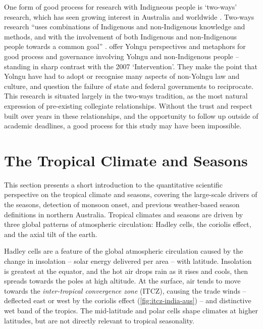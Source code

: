 One form of good process for research with Indigneous people is `two-ways'
research, which has seen growing interest in Australia and worldwide
\citep{turner2009,prober2011}.  Two-ways research ``uses combinations of
Indigenous and non-Indigenous knowledge and methods, and with the involvement
of both Indigenous and non-Indigenous people towards a common goal''
\citep{ens2014}.
%
\citet{marika2009} offer Yolngu perspectives and metaphors for good process
and governance involving Yolngu and non-Indigenous people -- standing in sharp
contrast with the 2007 `Intervention'.  They make the point that Yolngu have
had to adopt or recognise many aspects of non-Yolngu law and culture, and
question the failure of state and federal governments to reciprocate.
%
This research is situated largely in the two-ways tradition, as the most
natural expression of pre-existing collegiate relationships.  Without the
trust and respect built over years in these relationships, and the opportunity
to follow up outside of academic deadlines, a good process for this study
may have been impossible.



\section{The Tropical Climate and Seasons}
\label{sec:lit-tropical-climate}


This section presents a short introduction to the quantitative scientific
perspective on the tropical climate and seasons, covering the large-scale
drivers of the seasons, detection of monsoon onset, and previous
weather-based season definitions in northern Australia.
%
Tropical climates and seasons are driven by three global patterns of
atmospheric circulation:  Hadley cells, the coriolis effect, and the axial
tilt of the earth.

Hadley cells are a feature of the global atmospheric circulation
caused by the change in insolation -- solar energy delivered per area --
with latitude.  Insolation is greatest at the equator, and the hot air drops
rain as it rises and cools, then spreads towards the poles at high altitude.
At the surface, air tends to move towards the \textit{inter-tropical
convergence zone} (ITCZ), causing the trade winds -- deflected east or west
by the coriolis effect (\cref{fig:itcz-india-aus}) -- and distinctive wet band
of the tropics.  The mid-latitude and polar cells shape climates at higher
latitudes, but are not directly relevant to tropical seasonality.


